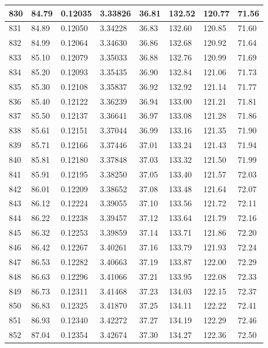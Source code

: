 \documentclass[12pt,a4paper,twoside]{article}
\begin{document}
\begin{center}
\begin{longtable}{l l l l | l l l l}
830 & 84.79 & 0.12035 & 3.33826 & 36.81 & 132.52 & 120.77 & 71.56 \\ \hline
831 & 84.89 & 0.12050 & 3.34228 & 36.83 & 132.60 & 120.85 & 71.60 \\ \hline
832 & 84.99 & 0.12064 & 3.34630 & 36.86 & 132.68 & 120.92 & 71.64 \\ \hline
833 & 85.10 & 0.12079 & 3.35033 & 36.88 & 132.76 & 120.99 & 71.69 \\ \hline
834 & 85.20 & 0.12093 & 3.35435 & 36.90 & 132.84 & 121.06 & 71.73 \\ \hline
835 & 85.30 & 0.12108 & 3.35837 & 36.92 & 132.92 & 121.14 & 71.77 \\ \hline
836 & 85.40 & 0.12122 & 3.36239 & 36.94 & 133.00 & 121.21 & 71.81 \\ \hline
837 & 85.50 & 0.12137 & 3.36641 & 36.97 & 133.08 & 121.28 & 71.86 \\ \hline
838 & 85.61 & 0.12151 & 3.37044 & 36.99 & 133.16 & 121.35 & 71.90 \\ \hline
839 & 85.71 & 0.12166 & 3.37446 & 37.01 & 133.24 & 121.43 & 71.94 \\ \hline
840 & 85.81 & 0.12180 & 3.37848 & 37.03 & 133.32 & 121.50 & 71.99 \\ \hline
841 & 85.91 & 0.12195 & 3.38250 & 37.05 & 133.40 & 121.57 & 72.03 \\ \hline
842 & 86.01 & 0.12209 & 3.38652 & 37.08 & 133.48 & 121.64 & 72.07 \\ \hline
843 & 86.12 & 0.12224 & 3.39055 & 37.10 & 133.56 & 121.72 & 72.11 \\ \hline
844 & 86.22 & 0.12238 & 3.39457 & 37.12 & 133.64 & 121.79 & 72.16 \\ \hline
845 & 86.32 & 0.12253 & 3.39859 & 37.14 & 133.71 & 121.86 & 72.20 \\ \hline
846 & 86.42 & 0.12267 & 3.40261 & 37.16 & 133.79 & 121.93 & 72.24 \\ \hline
847 & 86.53 & 0.12282 & 3.40663 & 37.19 & 133.87 & 122.00 & 72.29 \\ \hline
848 & 86.63 & 0.12296 & 3.41066 & 37.21 & 133.95 & 122.08 & 72.33 \\ \hline
849 & 86.73 & 0.12311 & 3.41468 & 37.23 & 134.03 & 122.15 & 72.37 \\ \hline
850 & 86.83 & 0.12325 & 3.41870 & 37.25 & 134.11 & 122.22 & 72.41 \\ \hline
851 & 86.93 & 0.12340 & 3.42272 & 37.27 & 134.19 & 122.29 & 72.46 \\ \hline
852 & 87.04 & 0.12354 & 3.42674 & 37.30 & 134.27 & 122.36 & 72.50 \\ \hline

\end{longtable}
\end{center}
\end{document}
